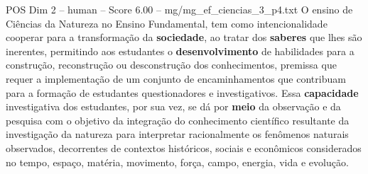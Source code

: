 \begin{textsample}{POS Dim 2 – human – Score 6.00 – mg/mg\_ef\_ciencias\_3\_p4.txt}  \label{ex:f2_pos_016}
O ensino de Ciências da Natureza no Ensino Fundamental, tem como intencionalidade cooperar para a transformação da \textbf{sociedade}, ao tratar dos \textbf{saberes} que lhes são inerentes, permitindo aos estudantes o \textbf{desenvolvimento} de habilidades para a construção, reconstrução ou desconstrução dos conhecimentos, premissa que requer a implementação de um conjunto de encaminhamentos que contribuam para a formação de estudantes questionadores e investigativos.
Essa \textbf{capacidade} investigativa dos estudantes, por sua vez, se dá por \textbf{meio} da observação e da pesquisa com o objetivo da integração do conhecimento científico resultante da investigação da natureza para interpretar racionalmente os fenômenos naturais observados, decorrentes de contextos históricos, sociais e econômicos considerados no tempo, espaço, matéria, movimento, força, campo, energia, vida e evolução.

\end{textsample}
